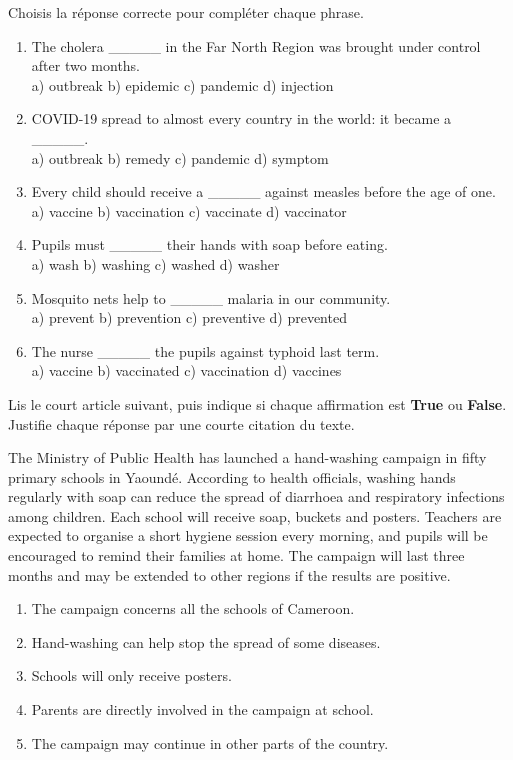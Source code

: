 \documentclass[11pt]{article}
\begin{document}
\begin{exercice}
Choisis la réponse correcte pour compléter chaque phrase.
\begin{enumerate}
\item The cholera \_\_\_\_\_ in the Far North Region was brought under control after two months.\\
a) outbreak \quad b) epidemic \quad c) pandemic \quad d) injection
\item COVID-19 spread to almost every country in the world: it became a \_\_\_\_\_.\\
a) outbreak \quad b) remedy \quad c) pandemic \quad d) symptom
\item Every child should receive a \_\_\_\_\_ against measles before the age of one.\\
a) vaccine \quad b) vaccination \quad c) vaccinate \quad d) vaccinator
\item Pupils must \_\_\_\_\_ their hands with soap before eating.\\
a) wash \quad b) washing \quad c) washed \quad d) washer
\item Mosquito nets help to \_\_\_\_\_ malaria in our community.\\
a) prevent \quad b) prevention \quad c) preventive \quad d) prevented
\item The nurse \_\_\_\_\_ the pupils against typhoid last term.\\
a) vaccine \quad b) vaccinated \quad c) vaccination \quad d) vaccines
\end{enumerate}
\end{exercice}

\begin{exercice}
Lis le court article suivant, puis indique si chaque affirmation est \textbf{True} ou \textbf{False}. Justifie chaque réponse par une courte citation du texte.
\begin{textebox}
The Ministry of Public Health has launched a hand-washing campaign in fifty primary schools in Yaoundé. According to health officials, washing hands regularly with soap can reduce the spread of diarrhoea and respiratory infections among children. Each school will receive soap, buckets and posters. Teachers are expected to organise a short hygiene session every morning, and pupils will be encouraged to remind their families at home. The campaign will last three months and may be extended to other regions if the results are positive.
\end{textebox}
\begin{enumerate}
\item The campaign concerns all the schools of Cameroon.
\item Hand-washing can help stop the spread of some diseases.
\item Schools will only receive posters.
\item Parents are directly involved in the campaign at school.
\item The campaign may continue in other parts of the country.
\end{enumerate}
\end{exercice}
\end{document}

